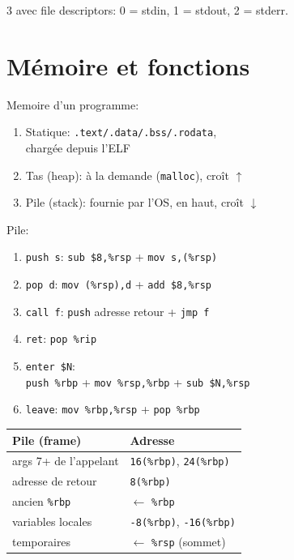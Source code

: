 \documentclass[12pt, a4paper]{article}
\begin{document}
\begin{multicols*}{3}
	avec file descriptors: 0 = stdin, 1 = stdout, 2 = stderr.

	\colbreak

	\section{Mémoire et fonctions}
	Memoire d'un programme:
	\begin{enumerate}[\roman*.]
		\item Statique: \lstinline|.text/.data/.bss/.rodata|,\\chargée depuis l'ELF
		\item {Tas} (heap): à la demande (\lstinline|malloc|), croît $\uparrow$
		\item {Pile} (stack): fournie par l'OS, en haut, croît $\downarrow$
	\end{enumerate}

	Pile:
	\begin{enumerate}[\roman*.]
		\item \lstinline|push s|: \lstinline|sub $8,%rsp| + \lstinline|mov s,(%rsp)|
		\item \lstinline|pop d|: \lstinline|mov (%rsp),d| + \lstinline|add $8,%rsp|
		\item \lstinline|call f|: \lstinline|push| adresse retour + \lstinline|jmp f|
		\item \lstinline|ret|: \lstinline|pop %rip|
		\item \lstinline|enter $N|:\\\lstinline|push %rbp| + \lstinline|mov %rsp,%rbp| + \lstinline|sub $N,%rsp|
		\item \lstinline|leave|: \lstinline|mov %rbp,%rsp| + \lstinline|pop %rbp|
	\end{enumerate}
	\begin{tabular}{|l|l|}
		\hline
		\textbf{Pile (frame)} & \textbf{Adresse}                        \\
		\hline
		args 7+ de l'appelant & \texttt{16(\%rbp)}, \texttt{24(\%rbp)}  \\
		adresse de retour     & \texttt{8(\%rbp)}                       \\
		ancien \texttt{\%rbp} & $\leftarrow$ \texttt{\%rbp}             \\
		variables locales     & \texttt{-8(\%rbp)}, \texttt{-16(\%rbp)} \\
		temporaires           & $\leftarrow$ \texttt{\%rsp} (sommet)    \\
		\hline
	\end{tabular}


\end{multicols*}
\end{document}
